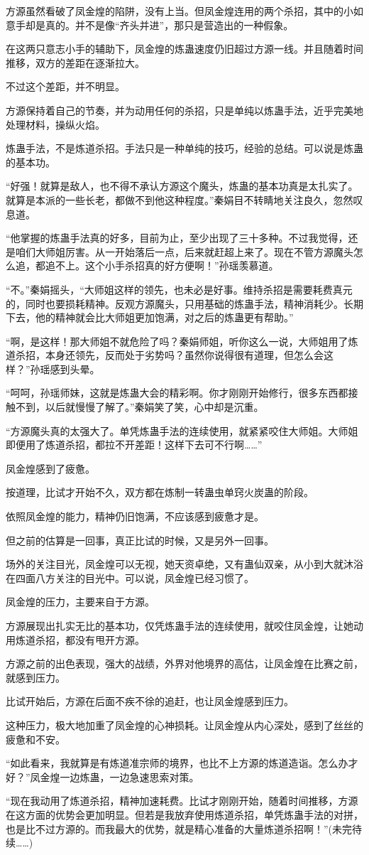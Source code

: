 \begin{this_body}
方源虽然看破了凤金煌的陷阱，没有上当。但凤金煌连用的两个杀招，其中的小如意手却是真的。并不是像“齐头并进”，那只是营造出的一种假象。

在这两只意志小手的辅助下，凤金煌的炼蛊速度仍旧超过方源一线。并且随着时间推移，双方的差距在逐渐拉大。

不过这个差距，并不明显。

方源保持着自己的节奏，并为动用任何的杀招，只是单纯以炼蛊手法，近乎完美地处理材料，操纵火焰。

炼蛊手法，不是炼道杀招。手法只是一种单纯的技巧，经验的总结。可以说是炼蛊的基本功。

“好强！就算是敌人，也不得不承认方源这个魔头，炼蛊的基本功真是太扎实了。就算是本派的一些长老，都做不到他这种程度。”秦娟目不转睛地关注良久，忽然叹息道。

“他掌握的炼蛊手法真的好多，目前为止，至少出现了三十多种。不过我觉得，还是咱们大师姐厉害。从一开始落后一点，后来就赶超上来了。现在不管方源魔头怎么追，都追不上。这个小手杀招真的好方便啊！”孙瑶羡慕道。

“不。”秦娟摇头，“大师姐这样的领先，也未必是好事。维持杀招是需要耗费真元的，同时也要损耗精神。反观方源魔头，只用基础的炼蛊手法，精神消耗少。长期下去，他的精神就会比大师姐更加饱满，对之后的炼蛊更有帮助。”

“啊，是这样！那大师姐不就危险了吗？秦娟师姐，听你这么一说，大师姐用了炼道杀招，本身还领先，反而处于劣势吗？虽然你说得很有道理，但怎么会这样？”孙瑶感到头晕。

“呵呵，孙瑶师妹，这就是炼蛊大会的精彩啊。你才刚刚开始修行，很多东西都接触不到，以后就慢慢了解了。”秦娟笑了笑，心中却是沉重。

“方源魔头真的太强大了。单凭炼蛊手法的连续使用，就紧紧咬住大师姐。大师姐即便用了炼道杀招，都拉不开差距！这样下去可不行啊……”

凤金煌感到了疲惫。

按道理，比试才开始不久，双方都在炼制一转蛊虫单窍火炭蛊的阶段。

依照凤金煌的能力，精神仍旧饱满，不应该感到疲惫才是。

但之前的估算是一回事，真正比试的时候，又是另外一回事。

场外的关注目光，凤金煌可以无视，她天资卓绝，又有蛊仙双亲，从小到大就沐浴在四面八方关注的目光中。可以说，凤金煌已经习惯了。

凤金煌的压力，主要来自于方源。

方源展现出扎实无比的基本功，仅凭炼蛊手法的连续使用，就咬住凤金煌，让她动用炼道杀招，都没有甩开方源。

方源之前的出色表现，强大的战绩，外界对他境界的高估，让凤金煌在比赛之前，就感到压力。

比试开始后，方源在后面不疾不徐的追赶，也让凤金煌感到压力。

这种压力，极大地加重了凤金煌的心神损耗。让凤金煌从内心深处，感到了丝丝的疲惫和不安。

“如此看来，我就算是有炼道准宗师的境界，也比不上方源的炼道造诣。怎么办才好？”凤金煌一边炼蛊，一边急速思索对策。

“现在我动用了炼道杀招，精神加速耗费。比试才刚刚开始，随着时间推移，方源在这方面的优势会更加明显。但若是我放弃使用炼道杀招，单凭炼蛊手法的对拼，也是比不过方源的。而我最大的优势，就是精心准备的大量炼道杀招啊！”(未完待续……)

\end{this_body}


